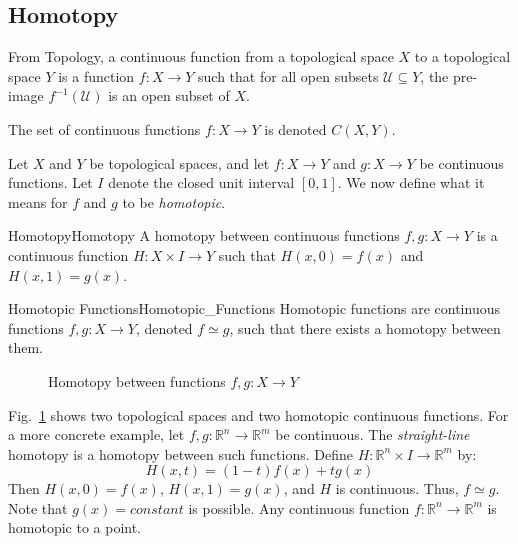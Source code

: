 \documentclass[crop=false,class=book,oneside]{standalone}                      %
\begin{document}
        \subsection{Homotopy}
            From Topology, a continuous function from a topological space $X$
            to a topological space $Y$ is a function $f:X\rightarrow{Y}$ such
            that for all open subsets $\mathcal{U}\subseteq{Y}$, the pre-image
            $f^{-1}(\mathcal{U})$ is an open subset of $X$.
            \begin{notation}
                The set of continuous functions $f:{X}\rightarrow{Y}$
                is denoted $C(X,Y)$.
            \end{notation}
            Let $X$ and $Y$ be topological spaces, and let
            $f:{X}\rightarrow{Y}$ and $g:{X}\rightarrow{Y}$ be continuous
            functions. Let $I$ denote the closed unit interval $[0,1]$. We now
            define what it means for $f$ and $g$ to be \textit{homotopic}.
            \begin{ldefinition}{Homotopy}{Homotopy}
                A homotopy between continuous functions
                $f,g:{X}\rightarrow{Y}$ is a continuous function
                $H:{X}\times{I}\rightarrow{Y}$ such that $H(x,0)=f(x)$ and
                $H(x,1)=g(x)$.
            \end{ldefinition}
            \begin{ldefinition}{Homotopic Functions}{Homotopic_Functions}
                Homotopic functions are continuous functions
                $f,g:{X}\rightarrow{Y}$, denoted ${f}\simeq{g}$,
                such that there exists a homotopy between them.
            \end{ldefinition}
            \begin{figure}[H]
                \centering
                \captionsetup{type=figure}
                
                \caption[Homotopy Diagram]
                        {Homotopy between functions $f,g:X\rightarrow Y$}
                \label{fig:homotopy_diagram_for_depicting_homotopy}
            \end{figure}
            \begin{lexample}
                Fig.~\ref{fig:homotopy_diagram_for_depicting_homotopy} shows
                two topological spaces and two homotopic continuous functions.
                For a more concrete example, let
                $f,g:\mathbb{R}^{n}\rightarrow\mathbb{R}^{m}$ be continuous.
                The \textit{straight-line} homotopy is a homotopy between such
                functions. Define
                $H:\mathbb{R}^{n}\times{I}\rightarrow\mathbb{R}^{m}$ by:
                \begin{equation}
                    \label{eqn:Surgery_Theory_Straight_Line_Homotopy}
                    H(x,t)=(1-t)f(x)+tg(x)
                \end{equation}
                Then $H(x,0)=f(x)$, $H(x,1)=g(x)$, and $H$ is continuous. Thus,
                ${f}\simeq{g}$. Note that $g(x)=constant$ is possible. Any
                continuous function $f:\mathbb{R}^{n}\rightarrow\mathbb{R}^{m}$
                is homotopic to a point.
            \end{lexample}
\end{document}

